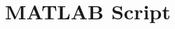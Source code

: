 %
%
%
\chapter{MATLAB Script\label{sec:MATLAB}}


\ifstandalone
% 
\printnoidxglossary[type=\acronymtype,nonumberlist]
\fi
%
